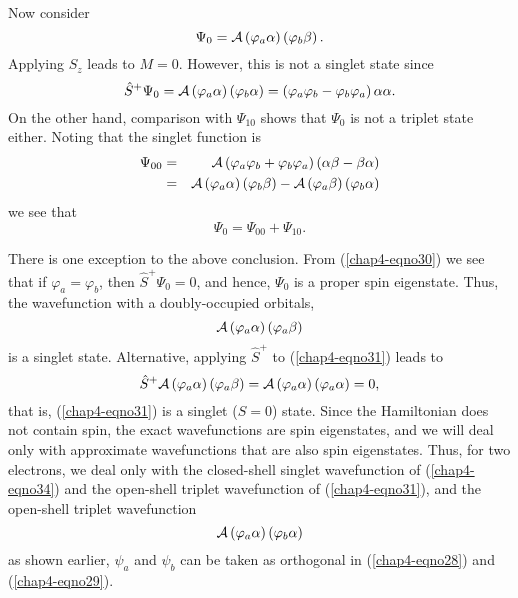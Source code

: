 Now consider
\begin{equation}
\Psi_0 = {\cal A} \left( \varphi_a \alpha \right) \left( \varphi_b \beta 
\right) .
\end{equation}
Applying $\hat{S}_z$ leads to $M = 0$.  However, this is not a singlet 
state since
\begin{equation}
\hat{S}^+ \Psi_0 = {\cal A} \left( \varphi_a \alpha \right) \left( \varphi_b 
\alpha \right) = \left( \varphi_a \varphi_b - \varphi_b \varphi_a \right) \alpha 
\alpha .
\label{chap4-eqno30}
\end{equation}
On the other hand, comparison with $\Psi_{10}$ shows that $\Psi_0$ is not a 
triplet state either.  Noting that the singlet function is
\begin{eqnarray}
\Psi_{00} &=& {\cal A} \left( \varphi_a \varphi_b + \varphi_b \varphi_a \right) 
\left( \alpha \beta - \beta \alpha \right)\cr
&=& {\cal A} \left( \varphi_a \alpha \right) \left( \varphi_b \beta \right) - {\cal 
A} \left( \varphi_a \beta \right) \left( \varphi_b \alpha 
\right)
\end{eqnarray}
we see that
\begin{equation}
\Psi_0 = \Psi_{00} + \Psi_{10} .
\end{equation}

There is one exception to the above conclusion.  From
(\ref{chap4-eqno30}) we see that if $\varphi_a = \varphi_b$, then
$\hat{S}^+ \Psi_0 = 0$, and hence, $\Psi_0$ is a proper spin
eigenstate.  Thus, the wavefunction with a doubly-occupied orbitals,
\begin{equation}
{\cal A} \left( \varphi_a \alpha \right) \left( \varphi_a \beta \right)
\label{chap4-eqno31}
\end{equation}
is a singlet state.  Alternative, applying $\hat{S}^+$ to (\ref{chap4-eqno31}) leads to
\begin{equation}
\hat{S}^+ {\cal A} \left( \varphi_a \alpha \right) \left( \varphi_a \beta 
\right) = {\cal A} \left( \varphi_a \alpha \right) \left( \varphi_a \alpha 
\right) = 0 ,
\end{equation}
that is, (\ref{chap4-eqno31}) is a singlet ($S = 0$) state.  Since the
Hamiltonian does not contain spin, the exact wavefunctions are spin
eigenstates, and we will deal only with approximate wavefunctions that
are also spin eigenstates.  Thus, for two electrons, we deal only with
the closed-shell singlet wavefunction of (\ref{chap4-eqno34}) and the
open-shell triplet wavefunction of (\ref{chap4-eqno31}), and the
open-shell triplet wavefunction
\begin{equation}
{\cal A} \left( \varphi_a \alpha \right) \left( \varphi_b \alpha \right)
\end{equation}
as shown earlier, $\psi_a$ and $\psi_b$ can be taken as orthogonal in
(\ref{chap4-eqno28}) and (\ref{chap4-eqno29}).

